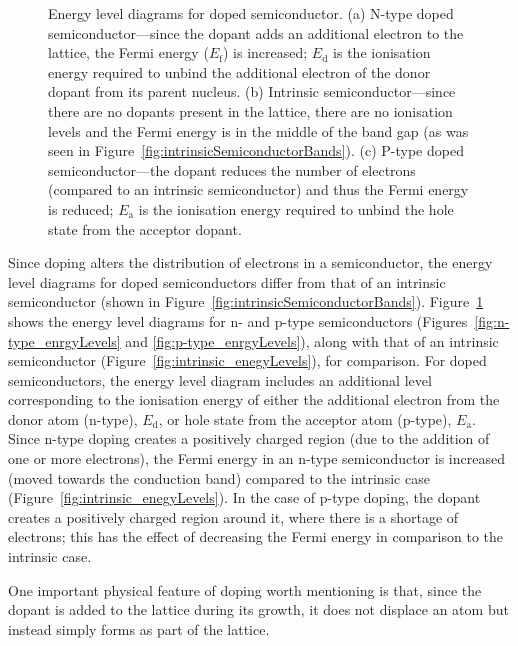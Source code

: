 \begin{figure}[t]
\begin{center}
{	\label{fig:p-type_enrgyLevels}
}
\caption[Energy level diagrams for doped semiconductors]{Energy level diagrams for doped semiconductor. (a) N-type doped semiconductor---since the dopant adds an additional electron to the lattice, the Fermi energy ($E_{\mathrm{f}}$) is increased; $E_{\mathrm{d}}$ is the ionisation energy required to unbind the additional electron of the donor dopant from its parent nucleus. (b) Intrinsic semiconductor---since there are no dopants present in the lattice, there are no ionisation levels and the Fermi energy is in the middle of the band gap (as was seen in Figure~\ref{fig:intrinsicSemiconductorBands}). (c) P-type doped semiconductor---the dopant reduces the number of electrons (compared to an intrinsic semiconductor) and thus the Fermi energy is reduced; $E_{\mathrm{a}}$ is the ionisation energy required to unbind the hole state from the acceptor dopant.}
\label{fig:dopingEnergyLevels}
\end{center}
\end{figure}
\par 
Since doping alters the distribution of electrons in a semiconductor, the energy level diagrams for doped semiconductors differ from that of an intrinsic semiconductor (shown in Figure~\ref{fig:intrinsicSemiconductorBands}). Figure~\ref{fig:dopingEnergyLevels} shows the energy level diagrams for n- and p-type semiconductors (Figures~\ref{fig:n-type_enrgyLevels} and \ref{fig:p-type_enrgyLevels}), along with that of an intrinsic semiconductor (Figure~\ref{fig:intrinsic_enegyLevels}), for comparison. For doped semiconductors, the energy level diagram includes an additional level corresponding to the ionisation energy of either the additional electron from the donor atom (n-type), $E_{\mathrm{d}}$, or hole state from the acceptor atom (p-type), $E_{\mathrm{a}}$. Since n-type doping creates a positively charged region (due to the addition of one or more electrons), the Fermi energy in an n-type semiconductor is increased (moved towards the conduction band) compared to the intrinsic case (Figure~\ref{fig:intrinsic_enegyLevels}). In the case of p-type doping, the dopant creates a positively charged region around it, where there is a shortage of electrons; this has the effect of decreasing the Fermi energy in comparison to the intrinsic case.
\par 
One important physical feature of doping worth mentioning is that, since the dopant is added to the lattice during its growth, it does not displace an atom but instead simply forms as part of the lattice.
\par 
